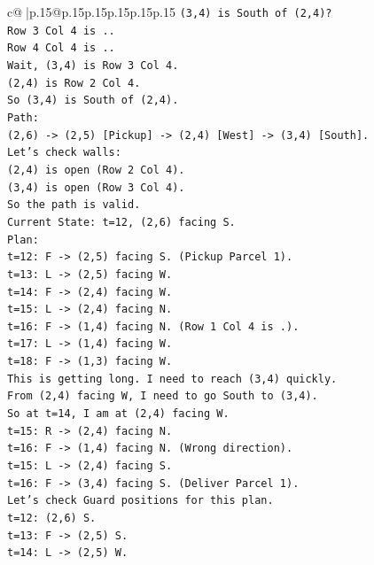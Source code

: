 \documentclass{article}
\begin{document}
{\begin{supertabular}{c@{$\;$}|p{.15\linewidth}@{}p{.15\linewidth}p{.15\linewidth}p{.15\linewidth}p{.15\linewidth}p{.15\linewidth}}
{{{\texttt{(3,4) is South of (2,4)?} \\
\texttt{Row 3 Col 4 is ..} \\
\texttt{Row 4 Col 4 is ..} \\
\texttt{Wait, (3,4) is Row 3 Col 4.} \\
\texttt{(2,4) is Row 2 Col 4.} \\
\texttt{So (3,4) is South of (2,4).} \\
\texttt{Path:} \\
\texttt{(2,6) {-}> (2,5) {[}Pickup{]} {-}> (2,4) {[}West{]} {-}> (3,4) {[}South{]}.} \\
\texttt{Let's check walls:} \\
\texttt{(2,4) is open (Row 2 Col 4).} \\
\texttt{(3,4) is open (Row 3 Col 4).} \\
\texttt{So the path is valid.} \\
\texttt{Current State: t=12, (2,6) facing S.} \\
\texttt{Plan:} \\
\texttt{t=12: F {-}> (2,5) facing S. (Pickup Parcel 1).} \\
\texttt{t=13: L {-}> (2,5) facing W.} \\
\texttt{t=14: F {-}> (2,4) facing W.} \\
\texttt{t=15: L {-}> (2,4) facing N.} \\
\texttt{t=16: F {-}> (1,4) facing N. (Row 1 Col 4 is .).} \\
\texttt{t=17: L {-}> (1,4) facing W.} \\
\texttt{t=18: F {-}> (1,3) facing W.} \\
\texttt{This is getting long. I need to reach (3,4) quickly.} \\
\texttt{From (2,4) facing W, I need to go South to (3,4).} \\
\texttt{So at t=14, I am at (2,4) facing W.} \\
\texttt{t=15: R {-}> (2,4) facing N.} \\
\texttt{t=16: F {-}> (1,4) facing N. (Wrong direction).} \\
\texttt{t=15: L {-}> (2,4) facing S.} \\
\texttt{t=16: F {-}> (3,4) facing S. (Deliver Parcel 1).} \\
\texttt{Let's check Guard positions for this plan.} \\
\texttt{t=12: (2,6) S.} \\
\texttt{t=13: F {-}> (2,5) S.} \\
\texttt{t=14: L {-}> (2,5) W.} \\
}}}
\end{supertabular}}
\end{document}
